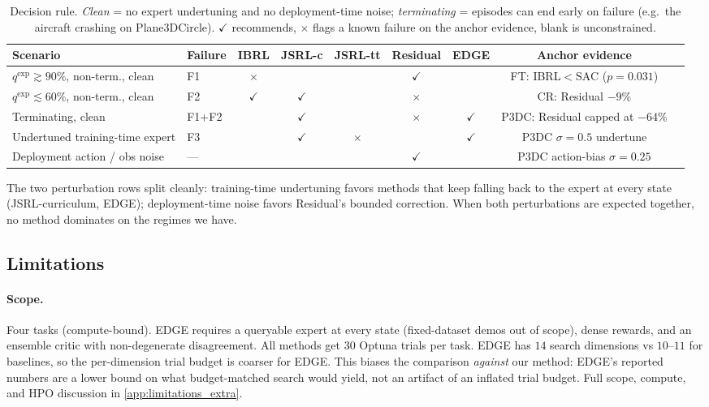 \documentclass{article}
\begin{document}
\begin{table}[h]
\centering
\footnotesize
\renewcommand{\arraystretch}{1.15}
\setlength{\tabcolsep}{4pt}
\begin{tabular}{@{}llccccccl@{}}
\toprule
\textbf{Scenario} & \textbf{Failure}
& \textbf{IBRL} & \textbf{JSRL-c} & \textbf{JSRL-tt}
& \textbf{Residual} & \textbf{EDGE} & \textbf{Anchor evidence} \\
\midrule
$q^{\mathrm{exp}}\!\gtrsim\!90\%$, non-term., clean   & F1     & $\times$ &          &          & $\checkmark$ &              & FT: IBRL$<$SAC ($p{=}0.031$) \\
$q^{\mathrm{exp}}\!\lesssim\!60\%$, non-term., clean  & F2     & $\checkmark$ & $\checkmark$ &      & $\times$    &              & CR: Residual $-9\%$ \\
Terminating, clean                          & F1+F2  &          & $\checkmark$ &      & $\times$    & $\checkmark$ & P3DC: Residual capped at $-64\%$ \\
\midrule
Undertuned training-time expert             & F3     &          & $\checkmark$ & $\times$ &          & $\checkmark$ & P3DC $\sigma{=}0.5$ undertune \\
Deployment action / obs noise               & ---    &          &          &          & $\checkmark$ &              & P3DC action-bias $\sigma{=}0.25$ \\
\bottomrule
\end{tabular}
\caption{Decision rule. \emph{Clean} = no expert undertuning and no
deployment-time noise; \emph{terminating} = episodes can end early
on failure (e.g.\ the aircraft crashing on Plane3DCircle).
$\checkmark$ recommends, $\times$ flags a known failure on the
anchor evidence, blank is unconstrained.}
\label{tab:decision_rule}
\end{table}

The two perturbation rows split cleanly: training-time undertuning
favors methods that keep falling back to the expert at every state
(JSRL-curriculum, EDGE); deployment-time noise favors Residual's
bounded correction. When both perturbations are expected together,
no method dominates on the regimes we have.

\subsection{Limitations}
\label{sec:limitations}

\paragraph{Scope.}
Four tasks (compute-bound). EDGE requires a queryable expert at
every state (fixed-dataset demos out of scope), dense rewards, and an
ensemble critic with non-degenerate disagreement. All methods get $30$ Optuna trials per task. EDGE has $14$ search
dimensions vs $10$--$11$ for baselines, so the per-dimension trial
budget is coarser for EDGE. This biases the comparison
\emph{against} our method: EDGE's reported numbers are a lower bound
on what budget-matched search would yield, not an artifact of an
inflated trial budget. Full scope, compute, and HPO discussion in
\cref{app:limitations_extra}.
\end{document}
